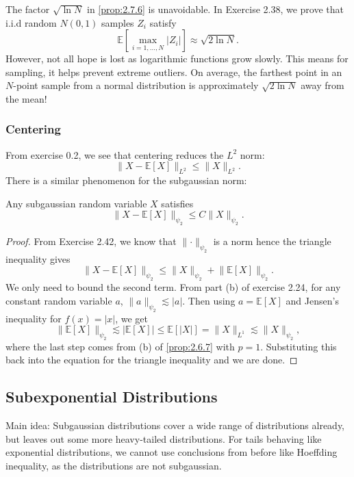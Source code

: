 \begin{remark}
\label{rmk:2.7.7}
The factor $\sqrt{\ln{N}}$ in \cref{prop:2.7.6} is unavoidable. In Exercise 2.38, we prove that 
i.i.d random $N(0, 1)$ samples $Z_i$ satisfy 
\[ \mathbb{E}[\max_{i = 1, \dots, N} |Z_i|] \approx \sqrt{2 \ln{N}}. \]
However, not all hope is lost as logarithmic functions grow slowly. This means for sampling, 
it helps prevent extreme outliers. On average, the farthest point in an $N$-point sample from a 
normal distribution is approximately $\sqrt{2 \ln{N}}$ away from the mean!
\end{remark}


\subsubsection{Centering}
From exercise 0.2, we see that centering reduces the $L^2$ norm: 
\[ \lVert X - \mathbb{E}[X] \rVert_{L^2} \leq \lVert X \rVert_{L^2}. \]
There is a similar phenomenon for the subgaussian norm: 
\begin{lemma}[Centering]
\label{lem:2.7.8}
Any subgaussian random variable $X$ satisfies 
\[ \lVert X - \mathbb{E}[X] \rVert_{\psi_2} \leq C \lVert X \rVert_{\psi_2}. \]
\end{lemma}

\begin{proof}
From Exercise 2.42, we know that $\lVert \cdot \rVert_{\psi_2}$ is a norm hence the triangle inequality gives 
\[ \lVert X - \mathbb{E}[X] \rVert_{\psi_2} \leq \lVert X \rVert_{\psi_2} 
+ \lVert \mathbb{E}[X] \rVert_{\psi_2}. \]
We only need to bound the second term. From part (b) of exercise 2.24, for any constant random 
variable $a$, $\lVert a \rVert_{\psi_2} \lesssim |a|$. Then using $a = \mathbb{E}[X]$ and Jensen's inequality 
for $f(x) = |x|$, we get
\[ \lVert \mathbb{E}[X] \rVert_{\psi_2} \lesssim |\mathbb{E}[X]| \leq \mathbb{E}[|X|] 
= \lVert X \rVert_{L^1} \lesssim \lVert X \rVert_{\psi_2}, \]
where the last step comes from (b) of \cref{prop:2.6.7} with $p = 1$. Substituting this back into the 
equation for the triangle inequality and we are done.
\end{proof}


\subsection{Subexponential Distributions}
Main idea: Subgaussian distributions cover a wide range of distributions already, but leaves out 
some more heavy-tailed distributions. For tails behaving like exponential distributions, we cannot use 
conclusions from before like Hoeffding inequality, as the distributions are not subgaussian. 


